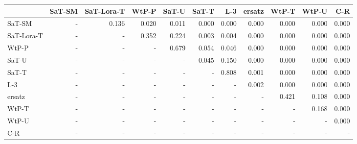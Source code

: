 \begin{tabular}{lrrrrrrrrrr}
\toprule
 & SaT-SM & SaT-Lora-T & WtP-P & SaT-U & SaT-T & L-3 & ersatz & WtP-T & WtP-U & C-R \\
\midrule
SaT-SM & - & 0.136 & 0.020 & 0.011 & 0.000 & 0.000 & 0.000 & 0.000 & 0.000 & 0.000 \\
SaT-Lora-T & - & - & 0.352 & 0.224 & 0.003 & 0.004 & 0.000 & 0.000 & 0.000 & 0.000 \\
WtP-P & - & - & - & 0.679 & 0.054 & 0.046 & 0.000 & 0.000 & 0.000 & 0.000 \\
SaT-U & - & - & - & - & 0.045 & 0.150 & 0.000 & 0.000 & 0.000 & 0.000 \\
SaT-T & - & - & - & - & - & 0.808 & 0.001 & 0.000 & 0.000 & 0.000 \\
L-3 & - & - & - & - & - & - & 0.002 & 0.000 & 0.000 & 0.000 \\
ersatz & - & - & - & - & - & - & - & 0.421 & 0.108 & 0.000 \\
WtP-T & - & - & - & - & - & - & - & - & 0.168 & 0.000 \\
WtP-U & - & - & - & - & - & - & - & - & - & 0.000 \\
C-R & - & - & - & - & - & - & - & - & - & - \\
\bottomrule
\end{tabular}

